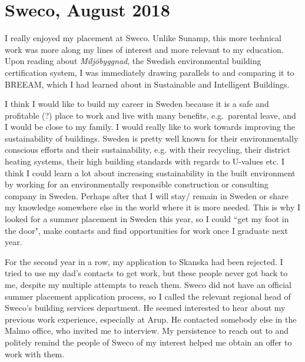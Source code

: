 \newpage
\section{Sweco, August 2018}


I really enjoyed my placement at Sweco.
Unlike Sunamp, this more technical work was more along my lines of interest and more relevant to my education.
Upon reading about \textit{Miljöbyggnad}, the Swedish environmental building certification system, I was immediately drawing parallels to and comparing it to BREEAM, which I had learned about in Sustainable and Intelligent Buildings.

I think I would like to build my career in Sweden because it is a safe and profitable (?) place to work and live with many benefits, e.g.\ parental leave, and I would be close to my family.
I would really like to work towards improving the sustainability of buildings.
Sweden is pretty well known for their environmentally conscious efforts and their sustainability, e.g. with their recycling, their district heating systems, their high building standards with regards to U-values etc.
I think I could learn a lot about increasing sustainability in the built environment by working for an environmentally responsible construction or consulting company in Sweden.
Perhaps after that I will stay/ remain in Sweden or share my knowledge somewhere else in the world where it is more needed.
This is why I looked for a summer placement in Sweden this year, so I could ``get my foot in the door", make contacts and find opportunities for work once I graduate next year.

For the second year in a row, my application to Skanska had been rejected.
I tried to use my dad's contacts to get work, but these people never got back to me, despite my multiple attempts to reach them.
Sweco did not have an official summer placement application process, so I called the relevant regional head of Sweco's building services department.
He seemed interested to hear about my previous work experience, especially at Arup.
He contacted somebody else in the Malmo office, who invited me to interview.
My persistence to reach out to and politely remind the people of Sweco of my interest helped me obtain an offer to work with them.

